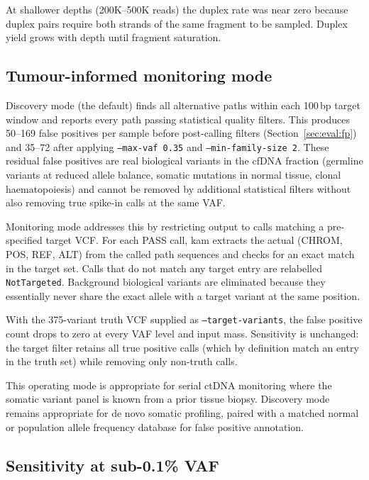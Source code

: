 At shallower depths (200K--500K reads) the duplex rate was near zero because
duplex pairs require both strands of the same fragment to be sampled.
Duplex yield grows with depth until fragment saturation.

\subsection{Tumour-informed monitoring mode}
\label{sec:eval:targeting}

Discovery mode (the default) finds all alternative paths within each
100\,bp target window and reports every path passing statistical quality filters.
This produces 50--169 false positives per sample before post-calling filters
(Section~\ref{sec:eval:fp}) and 35--72 after applying \texttt{--max-vaf 0.35}
and \texttt{--min-family-size 2}.
These residual false positives are real biological variants in the cfDNA fraction
(germline variants at reduced allele balance, somatic mutations in normal tissue,
clonal haematopoiesis) and cannot be removed by additional statistical filters
without also removing true spike-in calls at the same VAF.

Monitoring mode addresses this by restricting output to calls matching a
pre-specified target VCF.
For each PASS call, kam extracts the actual (CHROM, POS, REF, ALT) from the
called path sequences and checks for an exact match in the target set.
Calls that do not match any target entry are relabelled \texttt{NotTargeted}.
Background biological variants are eliminated because they essentially never
share the exact allele with a target variant at the same position.

With the 375-variant truth VCF supplied as \texttt{--target-variants}, the
false positive count drops to zero at every VAF level and input mass.
Sensitivity is unchanged: the target filter retains all true positive calls
(which by definition match an entry in the truth set) while removing only
non-truth calls.

This operating mode is appropriate for serial ctDNA monitoring where the
somatic variant panel is known from a prior tissue biopsy.
Discovery mode remains appropriate for de novo somatic profiling, paired with
a matched normal or population allele frequency database for false positive
annotation.

\subsection{Sensitivity at sub-0.1\% VAF}
\label{sec:eval:sensitivity}

